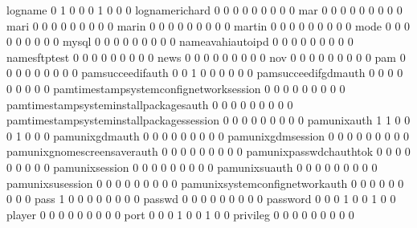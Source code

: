 \documentclass[compress,8pt]{beamer}
\begin{document}
\begin{frame}
\begin{Schunk}
  logname                                    0   1   0   0   0   1   0   0   0
  lognamerichard                             0   0   0   0   0   0   0   0   0
  mar                                        0   0   0   0   0   0   0   0   0
  mari                                       0   0   0   0   0   0   0   0   0
  marin                                      0   0   0   0   0   0   0   0   0
  martin                                     0   0   0   0   0   0   0   0   0
  mode                                       0   0   0   0   0   0   0   0   0
  mysql                                      0   0   0   0   0   0   0   0   0
  nameavahiautoipd                           0   0   0   0   0   0   0   0   0
  namesftptest                               0   0   0   0   0   0   0   0   0
  news                                       0   0   0   0   0   0   0   0   0
  nov                                        0   0   0   0   0   0   0   0   0
  pam                                        0   0   0   0   0   0   0   0   0
  pamsucceedifauth                           0   0   1   0   0   0   0   0   0
  pamsucceedifgdmauth                        0   0   0   0   0   0   0   0   0
  pamtimestampsystemconfignetworksession     0   0   0   0   0   0   0   0   0
  pamtimestampsysteminstallpackagesauth      0   0   0   0   0   0   0   0   0
  pamtimestampsysteminstallpackagessession   0   0   0   0   0   0   0   0   0
  pamunixauth                                1   1   0   0   0   1   0   0   0
  pamunixgdmauth                             0   0   0   0   0   0   0   0   0
  pamunixgdmsession                          0   0   0   0   0   0   0   0   0
  pamunixgnomescreensaverauth                0   0   0   0   0   0   0   0   0
  pamunixpasswdchauthtok                     0   0   0   0   0   0   0   0   0
  pamunixsession                             0   0   0   0   0   0   0   0   0
  pamunixsuauth                              0   0   0   0   0   0   0   0   0
  pamunixsusession                           0   0   0   0   0   0   0   0   0
  pamunixsystemconfignetworkauth             0   0   0   0   0   0   0   0   0
  pass                                       1   0   0   0   0   0   0   0   0
  passwd                                     0   0   0   0   0   0   0   0   0
  password                                   0   0   0   1   0   0   1   0   0
  player                                     0   0   0   0   0   0   0   0   0
  port                                       0   0   0   1   0   0   1   0   0
  privileg                                   0   0   0   0   0   0   0   0   0

\end{Schunk}
\end{frame}
\end{document}
